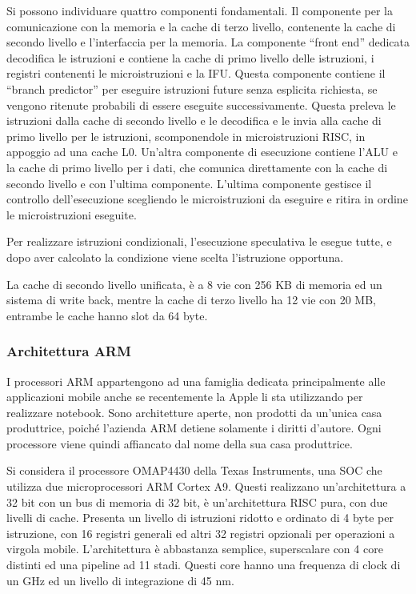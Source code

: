 \documentclass{article}
\numberwithin{equation}{subsection}
\begin{document}
Si possono individuare quattro componenti fondamentali. 
Il componente per la comunicazione con la memoria e la cache di terzo livello, contenente la cache di secondo livello e l'interfaccia per la memoria. 
La componente ``front end'' dedicata decodifica le istruzioni e contiene la cache di primo livello delle istruzioni, i registri contenenti le microistruzioni e la IFU. Questa componente contiene il ``branch predictor'' per eseguire istruzioni 
future senza esplicita richiesta, se vengono ritenute probabili di essere eseguite successivamente. 
Questa preleva le istruzioni dalla cache di secondo livello e le decodifica e le invia alla cache di primo livello per le istruzioni, scomponendole in 
microistruzioni RISC, in appoggio ad una cache L0. 
Un'altra componente di esecuzione contiene l'ALU e la cache di primo livello per i dati, che comunica direttamente con la cache di secondo livello e con l'ultima componente. 
L'ultima componente gestisce il controllo dell'esecuzione scegliendo le microistruzioni da eseguire e ritira in ordine le microistruzioni eseguite. 

Per realizzare istruzioni condizionali, l'esecuzione speculativa le esegue tutte, e dopo aver calcolato la condizione viene scelta l'istruzione opportuna. 

La cache di secondo livello unificata, è a 8 vie con 256 KB di memoria ed un sistema di write back, mentre la cache di terzo livello ha 12 vie con 20 MB, entrambe le cache hanno 
slot da 64 byte. 

\subsubsection{Architettura ARM}

I processori ARM appartengono ad una famiglia dedicata principalmente alle applicazioni mobile anche se recentemente la Apple li sta utilizzando per realizzare notebook. Sono architetture 
aperte, non prodotti da un'unica casa produttrice, poiché l'azienda ARM detiene solamente i diritti d'autore. Ogni processore viene quindi affiancato dal nome della sua casa produttrice. 

Si considera il processore OMAP4430 della Texas Instruments, una SOC che utilizza due microprocessori ARM Cortex A9. Questi realizzano un'architettura a 32 bit con un bus di 
memoria di 32 bit, è un'architettura RISC pura, con due livelli di cache. Presenta un livello di istruzioni ridotto e ordinato di 4 byte per istruzione, con 16 registri generali ed altri 32 
registri opzionali per operazioni a virgola mobile. L'architettura è abbastanza semplice, superscalare con 4 core distinti ed una pipeline ad 11 stadi. 
Questi core hanno una frequenza di clock di un GHz ed un livello di integrazione di 45 nm. 
\end{document}

